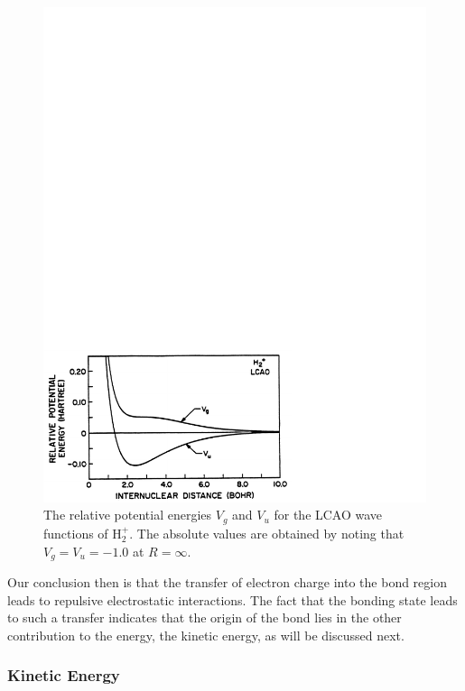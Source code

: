 \begin{figure}
\includegraphics[scale=0.75]{fig2-05}
\caption{The relative potential energies $V_g$ and $V_u$ for the LCAO
  wave functions of H$_2^+$. The absolute values are obtained by
  noting that $V_g = V_u = -1.0$ at $R=\infty$.}
\label{fig2-5}
\end{figure}

Our conclusion then is that the transfer of electron charge into the
bond region leads to repulsive electrostatic interactions. The fact
that the bonding state leads to such a transfer indicates that the
origin of the bond lies in the other contribution to the energy, the
kinetic energy, as will be discussed next.

\subsubsection{Kinetic Energy}


